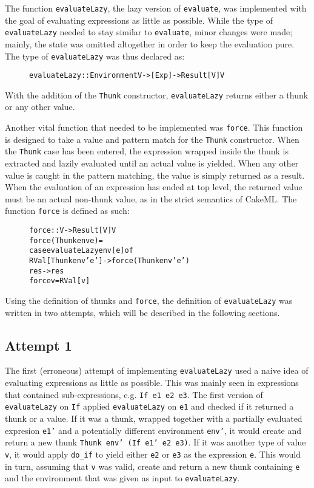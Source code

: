 The function \texttt{evaluateLazy}, the lazy version of \texttt{evaluate}, was
implemented with the goal of evaluating expressions as little as possible. While
the type of \texttt{evaluateLazy} needed to stay similar to
\texttt{evaluate}, minor changes were made; mainly, the state was omitted
altogether in order to keep the evaluation pure. The type of
\texttt{evaluateLazy} was thus declared as:

\begin{figure}[H]
\begin{alltt}
  evaluateLazy :: Environment V -> [Exp] -> Result [V] V
\end{alltt}
\end{figure}

\noindent With the addition of the \texttt{Thunk} constructor, \texttt{evaluateLazy}
returns either a thunk or any other value.

Another vital function that needed to be implemented was \texttt{force}.
This function is designed to take a value and pattern match for the
\texttt{Thunk} constructor. When the \texttt{Thunk} case has been entered,
the expression wrapped inside the thunk is extracted and lazily evaluated until
an actual value is yielded. When any other value is caught in the pattern matching,
the value is simply returned as a result.
When the evaluation of an expression has ended at top level, the returned value
must be an actual non-thunk value, as in the strict semantics of CakeML.
The function \texttt{force} is defined as such:

\begin{figure}[H]
\begin{alltt}
  force :: V -> Result [V] V
  force (Thunk env e) =
    case evaluateLazy env [e] of
      RVal [Thunk env' e'] -> force (Thunk env' e')
      res -> res
  force v = RVal [v]
\end{alltt}
\end{figure}

Using the definition of thunks and \texttt{force}, the definition of
\texttt{evaluateLazy} was written in two attempts, which
will be described in the following sections.

\subsection{Attempt 1}
The first (erroneous) attempt of implementing \texttt{evaluateLazy} used a naive
idea of evaluating expressions as little as possible. This was mainly seen in
expressions that contained sub-expressions, e.g. \texttt{If e1 e2 e3}. The first
version of \texttt{evaluateLazy} on \texttt{If} applied
\texttt{evaluateLazy} on \texttt{e1} and checked if it returned a thunk or a
value. If it was a thunk, wrapped together with a partially evaluated expresion
\texttt{e1'} and a potentially different environment \texttt{env'}, it would
create and return a new thunk \texttt{Thunk env' (If e1' e2 e3)}. If it was
another type of value \texttt{v}, it would apply \texttt{do\_if} to yield either
\texttt{e2} or \texttt{e3} as the expression \texttt{e}. This would in turn,
assuming that \texttt{v} was valid, create and return a new thunk containing
\texttt{e} and the environment that was given as input to \texttt{evaluateLazy}.

